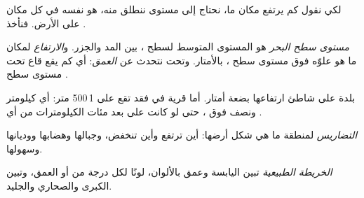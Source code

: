لكي نقول كم يرتفع مكان ما، نحتاج إلى مستوى ننطلق منه، هو نفسه في كل مكان
على الأرض. فنأخذ .

\begin{definition}\label{def:g4:world-physical-map:altitude}
\emph{مستوى سطح البحر} هو المستوى المتوسط لسطح
، بين المد والجزر. و\emph{الارتفاع} لمكان ما هو علوّه
فوق مستوى سطح ، بالأمتار. وتحت  نتحدث عن \emph{العمق}: أي كم
يقع قاع  تحت مستوى سطح .
\end{definition}

بلدة على شاطئ  ارتفاعها بضعة أمتار. أما قرية في  فقد تقع على
 1\,500 متر: أي كيلومتر ونصف فوق ، حتى لو كانت على
بعد مئات الكيلومترات من أي .

\begin{definition}[التضاريس]\label{def:g4:world-physical-map:relief}
\emph{التضاريس} لمنطقة ما هي شكل أرضها: أين ترتفع وأين
تنخفض، وجبالها وهضابها ووديانها
وسهولها.
\end{definition}

\begin{definition}\label{def:g4:world-physical-map:physical-map}
\emph{الخريطة الطبيعية} تبين  اليابسة وعمق
 بالألوان، لونًا لكل درجة من  أو العمق، وتبين 
الكبرى  والصحاري والجليد.
\end{definition}


